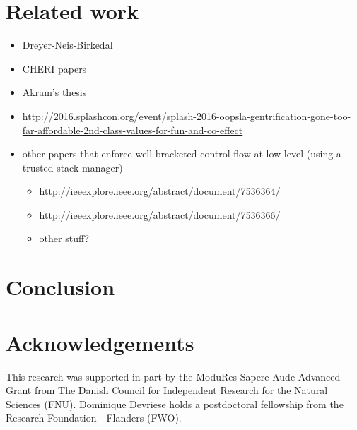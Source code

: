 \documentclass[compsoc,conference,letterpaper,fleqn]{IEEEtran}
\begin{document}
\section{Related work}

\begin{itemize}
\item Dreyer-Neis-Birkedal
\item CHERI papers
\item Akram's thesis
\item \url{http://2016.splashcon.org/event/splash-2016-oopsla-gentrification-gone-too-far-affordable-2nd-class-values-for-fun-and-co-effect}
\item other papers that enforce well-bracketed control flow at low level
(using a trusted stack manager)
\begin{itemize}
\item \url{http://ieeexplore.ieee.org/abstract/document/7536364/}
\item \url{http://ieeexplore.ieee.org/abstract/document/7536366/}
\item other stuff?
\end{itemize}
\end{itemize}

\section{Conclusion}

\section*{Acknowledgements}
\label{sec:acknowledgements}

This research was supported in part by the ModuRes Sapere Aude Advanced Grant from The Danish Council for Independent Research for the Natural Sciences (FNU).
Dominique Devriese holds a postdoctoral fellowship from the Research Foundation - Flanders (FWO).



\end{document}
